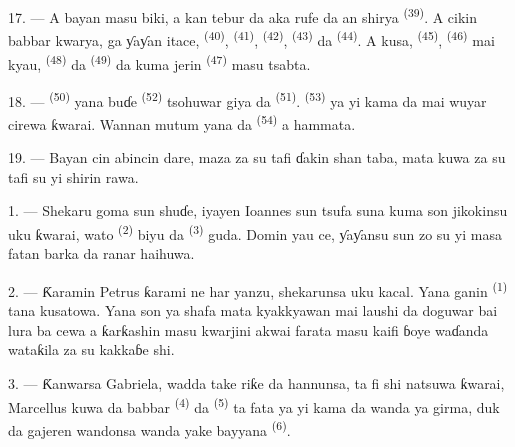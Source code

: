 \VUsaut{2.4mm}
\VUsaut{3.0mm}

17. --- A bayan masu biki, a kan tebur da aka rufe da  an shirya  \textsuperscript{(39)}. A cikin
babbar kwarya, ga ƴaƴan itace,  \textsuperscript{(40)},
 \textsuperscript{(41)}, 
\textsuperscript{(42)},  \textsuperscript{(43)} da
 \textsuperscript{(44)}. A kusa, 
\textsuperscript{(45)},  \textsuperscript{(46)} mai kyau,
 \textsuperscript{(48)} da  \textsuperscript{(49)} da kuma jerin 
\textsuperscript{(47)} masu tsabta.

18. ---  \textsuperscript{(50)} yana buɗe
 \textsuperscript{(52)} tsohuwar giya da  \textsuperscript{(51)}. 
\textsuperscript{(53)} ya yi kama da mai wuyar cirewa ƙwarai. Wannan
mutum yana da  \textsuperscript{(54)} a hammata.

19. --- Bayan cin abincin dare, maza za su tafi ɗakin shan taba, mata
kuwa za su tafi su yi shirin rawa.

\VUsaut{5.0mm}
\VUsaut{1.6mm}
\VUsaut{2.6mm}

\VUsaut{3.0mm}

1. --- Shekaru goma sun shuɗe, iyayen Ioannes sun tsufa suna kuma son
jikokinsu uku ƙwarai, wato  \textsuperscript{(2)}
biyu da  \textsuperscript{(3)} guda. Domin yau
 ce, ƴaƴansu sun zo su yi masa fatan
barka da ranar haihuwa.

2. --- Ƙaramin Petrus ƙarami ne har yanzu, shekarunsa uku kacal. Yana
ganin  \textsuperscript{(1)} tana kusatowa. Yana son ya
shafa mata kyakkyawan  mai laushi da doguwar
 bai lura ba cewa a ƙarƙashin 
masu kwarjini akwai farata masu kaifi ɓoye waɗanda wataƙila za su
kakkaɓe shi.

3. --- Ƙanwarsa Gabriela, wadda take riƙe da hannunsa, ta fi shi
natsuwa ƙwarai, Marcellus kuwa da babbar 
\textsuperscript{(4)} da  \textsuperscript{(5)} ta fata
ya yi kama da wanda ya girma, duk da gajeren wandonsa wanda yake
bayyana  \textsuperscript{(6)}.

